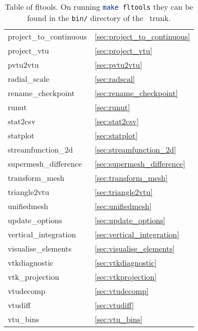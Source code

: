 \begin{table}
\begin{center}
\begin{tabular}{| l | l |}
	project\_to\_continuous			& \ref{sec:project_to_continuous} 	\\
	project\_vtu				& \ref{sec:project_vtu} 		\\
	pvtu2vtu				& \ref{sec:pvtu2vtu}			\\
        radial\_scale                           & \ref{sec:radscal}                     \\
	rename\_checkpoint			& \ref{sec:rename_checkpoint}		\\
	runut           			& \ref{sec:runut}		        \\
	stat2csv				& \ref{sec:stat2csv}			\\
	statplot				& \ref{sec:statplot} 			\\
	streamfunction\_2d			& \ref{sec:streamfunction_2d} 		\\
	supermesh\_difference			& \ref{sec:supermesh_difference} 	\\
	transform\_mesh				& \ref{sec:transform_mesh}		\\
	triangle2vtu				& \ref{sec:triangle2vtu}		\\
	unifiedmesh				& \ref{sec:unifiedmesh} 		\\
	update\_options				& \ref{sec:update_options}		\\	
	vertical\_integration			& \ref{sec:vertical_integration} 	\\
    visualise\_elements     & \ref{sec:visualise_elements} \\ 
	vtkdiagnostic				& \ref{sec:vtkdiagnostic}		\\
	vtk\_projection				& \ref{sec:vtkprojection}		\\
	vtudecomp				& \ref{sec:vtudecomp}			\\
	vtudiff					& \ref{sec:vtudiff}			\\
	vtu\_bins           			& \ref{sec:vtu_bins}			\\
    \hline
  \end{tabular}
\end{center}
\caption[Table of fltools]{Table of fltools. On running \lstinline[language = bash]+make fltools+ they can be found in the \lstinline[language = bash]+bin/+ directory of the \fluidity\ trunk.}
\label{tab:fltools}
\end{table}


